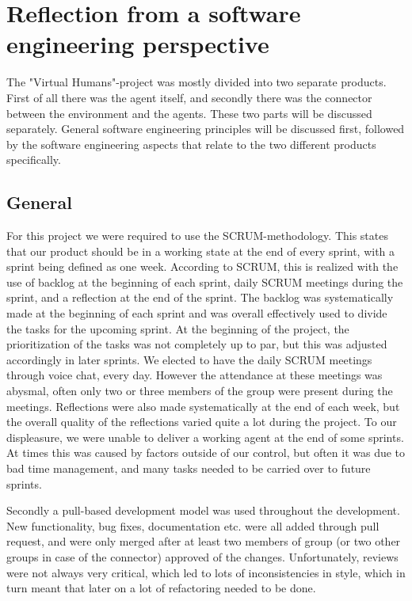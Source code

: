 \chapter[Reflection from a software engineering perspective]{Reflection from a software \\ engineering perspective}
\label{chap:Reflection from a software engineering perspective}

The "Virtual Humans"-project was mostly divided into two separate products.
First of all there was the agent itself, and secondly there was the connector between the environment and the agents.
These two parts will be discussed separately. General software engineering principles will be discussed first,
followed by the software engineering aspects that relate to the two different products specifically.

\section{General}
\label{sec:General}

For this project we were required to use the SCRUM-methodology. This states that our product should be in a working state at the end of every sprint, with a sprint being defined as one week.
According to SCRUM, this is realized with the use of backlog at the beginning of each sprint, daily SCRUM meetings during the sprint, and a reflection at the end of the sprint.
The backlog was systematically made at the beginning of each sprint and was overall effectively used to divide the tasks for the upcoming sprint.
At the beginning of the project, the prioritization of the tasks was not completely up to par, but this was adjusted accordingly in later sprints.
We elected to have the daily SCRUM meetings through voice chat, every day. However the attendance at these meetings was abysmal, often only two or three members of the group were present during the meetings.
Reflections were also made systematically at the end of each week, but the overall quality of the reflections varied quite a lot during the project.
To our displeasure, we were unable to deliver a working agent at the end of some sprints. At times this was caused by factors outside of our control, but often it was due to bad time management,
and many tasks needed to be carried over to future sprints.

Secondly a pull-based development model was used throughout the development. New functionality, bug fixes, documentation etc. were all added through pull request, and were only merged after at least
two members of group (or two other groups in case of the connector) approved of the changes.
Unfortunately, reviews were not always very critical, which led to lots of inconsistencies in style, which in turn meant that later on a lot of refactoring needed to be done.

